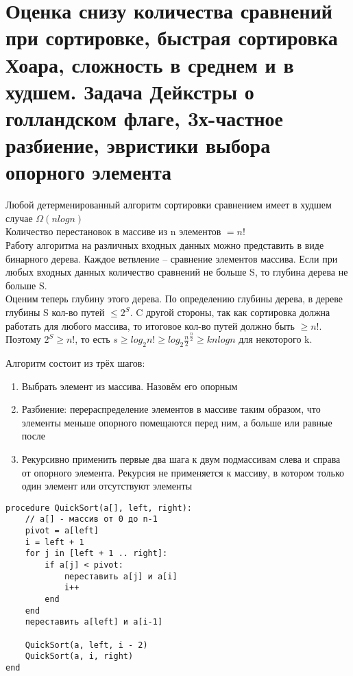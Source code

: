 \section {Оценка снизу количества сравнений при сортировке, быстрая сортировка Хоара, сложность в среднем и в худшем. Задача Дейкстры о голландском флаге, 3х-частное разбиение, эвристики выбора опорного элемента} 

 Любой детерменированный алгоритм сортировки сравнением имеет в худшем случае $\Omega (n log n)$ \\

\noindent Количество перестановок в массиве из n элементов $= n!$ \\
Работу алгоритма на различных входных данных можно
представить в виде бинарного дерева. Каждое ветвление –
сравнение элементов массива. Если при любых входных данных
количество сравнений не больше S, то глубина дерева не больше
S.\\

\noindent Оценим теперь глубину этого дерева. По определению глубины дерева, в дереве глубины S кол-во путей $\le 2^S$. C другой стороны, так как сортировка должна работать для любого массива, то итоговое кол-во путей должно быть $\ge n!$. Поэтому $2^S \ge n!$, то есть $s \ge log_2 n! \ge log_2 \frac{n}{2}^{\frac{n}{2}} \ge k n log n$ для некоторого k. \\


\noindent Алгоритм состоит из трёх шагов:
\begin{enumerate}
    \item Выбрать элемент из массива. Назовём его опорным
    \item Разбиение: перераспределение элементов в массиве таким образом, что элементы меньше опорного помещаются перед ним, а больше или равные после
    \item Рекурсивно применить первые два шага к двум подмассивам слева и справа от опорного элемента. Рекурсия не применяется к массиву, в котором только один элемент или отсутствуют элементы
\end{enumerate}

\begin{verbatim}
procedure QuickSort(a[], left, right):
    // a[] - массив от 0 до n-1
    pivot = a[left]
    i = left + 1
    for j in [left + 1 .. right]:
        if a[j] < pivot:
            переставить a[j] и a[i]
            i++
        end
    end
    переставить a[left] и a[i-1]
    
    QuickSort(a, left, i - 2)
    QuickSort(a, i, right)
end
\end{verbatim} \\

